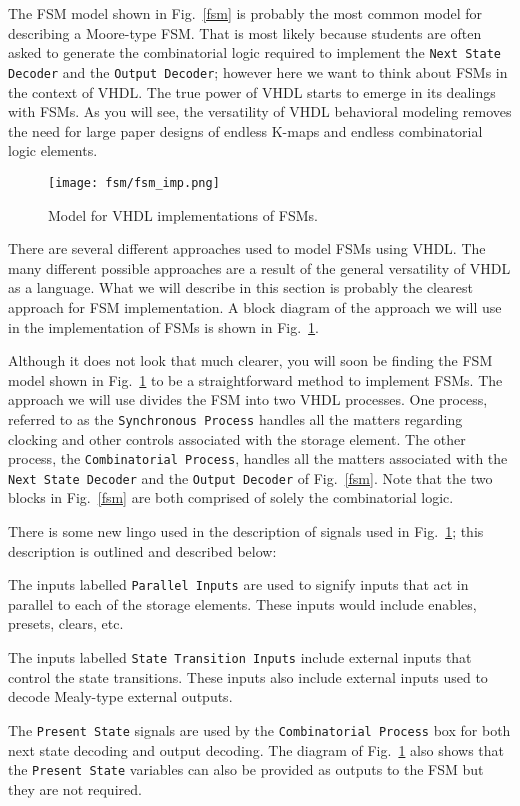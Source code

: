 The FSM model shown in Fig.~\ref{fsm} is probably the most common model for describing a Moore-type FSM. That is most likely because students are often asked to generate the combinatorial logic required to implement the \texttt{Next State Decoder} and the \texttt{Output Decoder}; however here we want to think about FSMs in the context of VHDL. The true power of VHDL starts to emerge in its dealings with FSMs. As you will see, the versatility of VHDL behavioral modeling removes the need for large paper designs of endless K-maps and endless combinatorial logic elements.

\begin{figure}[t]
    \centering
	\texttt{[image: fsm/fsm\_imp.png]}
	\caption{Model for VHDL implementations of FSMs.}
	\label{fsm_imp}
\end{figure}

There are several different approaches used to model FSMs using VHDL. The many different possible approaches are a result of the general versatility of VHDL as a language. What we will describe in this section is probably the clearest approach for FSM implementation. A block diagram of the approach we will use in the implementation of FSMs is shown in Fig.~\ref{fsm_imp}.

Although it does not look that much clearer, you will soon be finding the FSM model shown in Fig.~\ref{fsm_imp} to be a straightforward method to implement FSMs. The approach we will use divides the FSM into two VHDL processes. One process, referred to as the \texttt{Synchronous Process} handles all the matters regarding clocking and other controls associated with the storage element. The other process, the \texttt{Combinatorial Process}, handles all the matters associated with the \texttt{Next State Decoder} and the \texttt{Output Decoder} of Fig.~\ref{fsm}. Note that the two blocks in Fig.~\ref{fsm} are both comprised of solely the combinatorial logic.


There is some new lingo used in the description of signals used in Fig.~\ref{fsm_imp}; this description is outlined and described below: 
\begin{my_list}
\item The inputs labelled \texttt{Parallel Inputs} are used to signify inputs that act in parallel to each of the storage elements. These inputs would include enables, presets, clears, etc. 

\item The inputs labelled \texttt{State Transition Inputs} include external inputs that control the state transitions. These inputs also include external inputs used to decode Mealy-type external outputs. 

\item The \texttt{Present State} signals are used by the \texttt{Combinatorial Process} box for both next state decoding and output decoding. The diagram of Fig.~\ref{fsm_imp} also shows that the \texttt{Present State} variables can also be provided as outputs to the FSM but they are not required.
\end{my_list}

